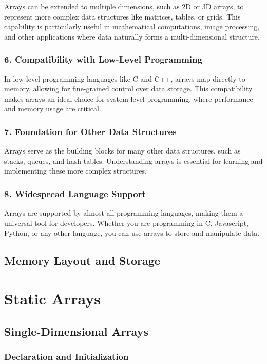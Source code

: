 \documentclass{book}
\begin{document}
	Arrays can be extended to multiple dimensions, such as 2D or 3D arrays, to represent more complex data structures like matrices, tables, or grids. This capability is particularly useful in mathematical computations, image processing, and other applications where data naturally forms a multi-dimensional structure.
	
	\subsection{6. Compatibility with Low-Level Programming}
	
	In low-level programming languages like C and C++, arrays map directly to memory, allowing for fine-grained control over data storage. This compatibility makes arrays an ideal choice for system-level programming, where performance and memory usage are critical. 
	
	\subsection{7. Foundation for Other Data Structures}
	
	Arrays serve as the building blocks for many other data structures, such as stacks, queues, and hash tables. Understanding arrays is essential for learning and implementing these more complex structures.
	
	\subsection{8. Widespread Language Support}
	
	Arrays are supported by almost all programming languages, making them a universal tool for developers. Whether you are programming in C, Javascript, Python, or any other language, you can use arrays to store and manipulate data.
	
	\section{Memory Layout and Storage}
	
	\chapter{Static Arrays}
	\section{Single-Dimensional Arrays}
	\subsection{Declaration and Initialization}
\end{document}
